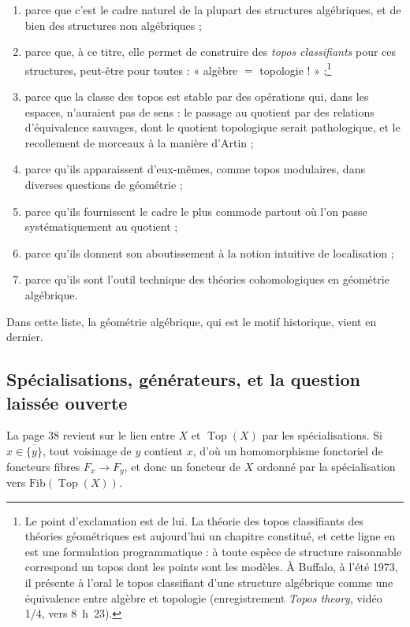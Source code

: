 \documentclass[11pt,a4paper]{article}
\begin{document}
\begin{enumerate}
\item[a)] parce que c'est le cadre naturel de la plupart des structures
algébriques, et de bien des structures non algébriques ;
\item[b)] parce que, à ce titre, elle permet de construire des \emph{topos
classifiants} pour ces structures, peut-être pour toutes : « algèbre $=$
topologie ! » ;\footnote{Le point d'exclamation est de lui. La théorie des
topos classifiants des théories géométriques est aujourd'hui un chapitre
constitué, et cette ligne en est une formulation programmatique : à toute
espèce de structure raisonnable correspond un topos dont les points sont les
modèles. À Buffalo, à l'été 1973, il présente à l'oral le topos classifiant
d'une structure algébrique comme une équivalence entre algèbre et topologie
(enregistrement \emph{Topos theory}, vidéo 1/4, vers 8~h~23).}
\item[c)] parce que la classe des topos est stable par des opérations qui, dans
les espaces, n'auraient pas de sens : le passage au quotient par des relations
d'équivalence sauvages, dont le quotient topologique serait pathologique, et le
recollement de morceaux à la manière d'Artin ;
\item[d)] parce qu'ils apparaissent d'eux-mêmes, comme topos modulaires, dans
diverses questions de géométrie ;
\item[e)] parce qu'ils fournissent le cadre le plus commode partout où l'on
passe systématiquement au quotient ;
\item[f)] parce qu'ils donnent son aboutissement à la notion intuitive de
localisation ;
\item[g)] parce qu'ils sont l'outil technique des théories cohomologiques en
géométrie algébrique.
\end{enumerate}

Dans cette liste, la géométrie algébrique, qui est le motif historique, vient
en dernier.

\subsection*{Spécialisations, générateurs, et la question laissée ouverte}

La page 38 revient sur le lien entre $X$ et $\operatorname{Top}(X)$ par les
spécialisations. Si $x \in \overline{\{y\}}$, tout voisinage de $y$ contient
$x$, d'où un homomorphisme fonctoriel de foncteurs fibres
$F_{x} \to F_{y}$, et donc un foncteur de $X$ ordonné par la spécialisation
vers $\mathrm{Fib}(\operatorname{Top}(X))$.
\end{document}
